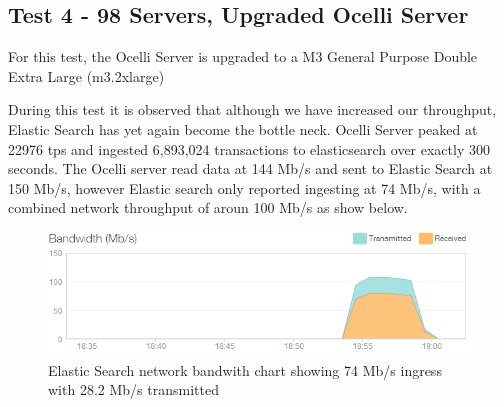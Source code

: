 \documentclass{llncs}
\begin{document}
\subsection{Test 4 - 98 Servers, Upgraded Ocelli Server}

For this test, the Ocelli Server is upgraded to a M3 General Purpose Double Extra Large (m3.2xlarge)

During this test it is observed that although we have increased our throughput, Elastic Search has yet again become the bottle neck. Ocelli Server peaked at 22976 tps and ingested 6,893,024 transactions to elasticsearch over exactly 300 seconds. The Ocelli server read data at 144 Mb/s and sent to Elastic Search at 150 Mb/s, however Elastic search only reported ingesting at 74 Mb/s, with a combined network throughput of aroun 100 Mb/s as show below.

\begin{figure}[h]
    \centering
    \includegraphics[scale=0.7]{app15}
    \caption{Elastic Search network bandwith chart showing 74 Mb/s ingress with 28.2 Mb/s transmitted}
    \label{fig:ocelli_dm}
\end{figure}
\end{document}
